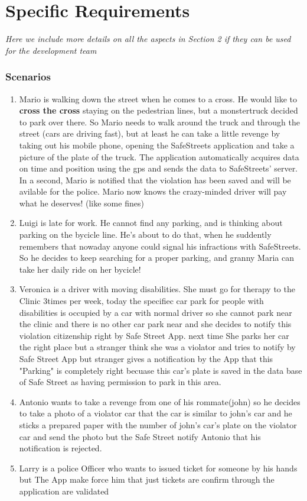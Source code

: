 \documentclass{article}
\newcommand{\enum}[1]{\texttt{#1.\arabic*}}
\begin{document}
\newpage
\section{Specific Requirements} \textit{Here we include more details on all the aspects in Section 2 if they can be used for the development team}

		\subsubsection{Scenarios}
		
			\begin{enumerate}[label=\enum{S}]
				\item \label{S:The man, the street and the monstertruck}
				Mario is walking down the street when he comes to a cross. He would like to \textbf{cross the cross} staying on the pedestrian lines, but a monstertruck decided to park over there. So Mario needs to walk around the truck and through the street (cars are driving fast), but at least he can take a little revenge by taking out his mobile phone, opening the SafeStreets application and take a picture of the plate of the truck. The application automatically acquires data on time and position using the gps and sends the data to SafeStreets' server. In a second, Mario is notified that the violation has been saved and will be avilable for the police.
Mario now knows the crazy-minded driver will pay what he deserves! (like some fines)
			\item \label{S:Prevent is better than healing}Luigi is late for work. He cannot find any parking, and is thinking about parking on the bycicle line. He's about to do that, when he suddently remembers that nowaday anyone could signal his infractions with SafeStreets. So he decides to keep searching for a proper parking, and granny Maria can take her daily ride on her bycicle!
		\item\label{S:disabilities}Veronica is a driver with moving disabilities. She must go for therapy to the Clinic 3times per week, today the specifiec car park for people with disabilities is occupied by a car with normal driver so she cannot park near the clinic and there is no other car park near and she decides to notify this violation citizenship right by Safe Street App. next time She parks her car the right place but a stranger think she was a violator and tries to notify by Safe Street App but stranger gives a notification by the App that this "Parking" is completely right becuase this car's plate is saved in the data base of Safe Street as having permission to park in this area.
		\item\label{S:cheating}Antonio wants to take a revenge from one of  his rommate(john) so he decides to take a photo of a violator car that the car is similar to john's car and he sticks a prepared paper with the number of john's car's plate on the violator car and send the photo but the Safe Street notify Antonio that his notification is rejected.
		\item\label{S:manually ticket}Larry is a police Officer who wants to issued ticket for someone by his hands but The App make force him that just  tickets are confirm through the application are validated 
	\end{enumerate}
\end{document}
